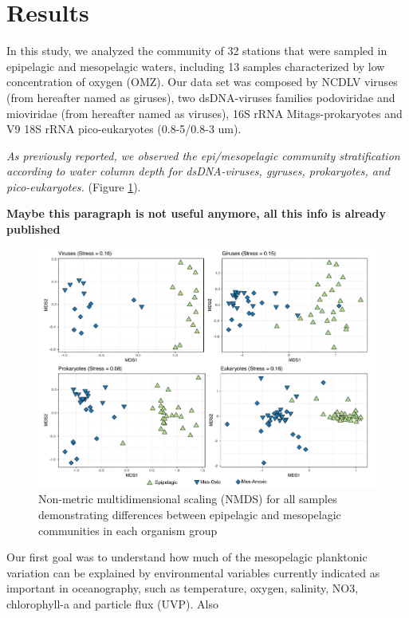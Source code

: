 \documentclass[fleqn,10pt]{wlscirep}
\begin{document}
\section*{Results}

In this study, we analyzed the community of 32 stations that were sampled in epipelagic and mesopelagic waters, including 13 samples characterized by low concentration of oxygen (OMZ). Our data set was composed by NCDLV viruses (from hereafter named as giruses), two dsDNA-viruses families podoviridae and mioviridae (from hereafter named as viruses), 16S rRNA Mitags-prokaryotes and V9 18S rRNA pico-eukaryotes (0.8-5/0.8-3 um).

\textit{As previously reported, we observed the epi/mesopelagic community stratification according to water column depth for dsDNA-viruses, gyruses, prokaryotes, and pico-eukaryotes.}  (Figure \ref{fig:nmds}).


\textbf{Maybe this paragraph is not useful anymore, all this info is already published}


\begin{figure}[ht]
    \centering
    \includegraphics[scale=0.5]{images/nmds_used_SF_to_print.pdf}
    \caption{Non-metric multidimensional scaling (NMDS) for all samples demonstrating differences between epipelagic and mesopelagic communities in each organism group}
    \label{fig:nmds}
\end{figure}

Our first goal was to understand how much of the mesopelagic planktonic variation can be explained by environmental variables currently indicated as important in oceanography, such as temperature, oxygen, salinity, NO3, chlorophyll-a and particle flux (UVP). Also 
\end{document}
